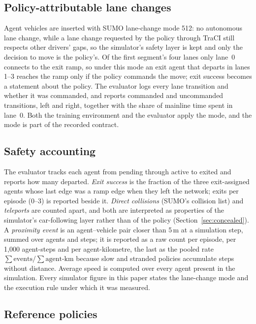 \subsection{Policy-attributable lane changes}
\label{sec:contract_lc}

Agent vehicles are inserted with SUMO lane-change mode 512: no autonomous lane change, while a lane change requested by the policy through TraCI still respects other drivers' gaps, so the simulator's safety layer is kept and only the decision to move is the policy's. Of the first segment's four lanes only lane~0 connects to the exit ramp, so under this mode an exit agent that departs in lanes 1--3 reaches the ramp only if the policy commands the move; exit success becomes a statement about the policy. The evaluator logs every lane transition and whether it was commanded, and reports commanded and uncommanded transitions, left and right, together with the share of mainline time spent in lane~0. Both the training environment and the evaluator apply the mode, and the mode is part of the recorded contract.

\subsection{Safety accounting}
\label{sec:contract_safety}

The evaluator tracks each agent from pending through active to exited and reports how many departed. \emph{Exit success} is the fraction of the three exit-assigned agents whose last edge was a ramp edge when they left the network; exits per episode (0--3) is reported beside it. \emph{Direct collisions} (SUMO's collision list) and \emph{teleports} are counted apart, and both are interpreted as properties of the simulator's car-following layer rather than of the policy (Section~\ref{sec:concealed}). A \emph{proximity event} is an agent--vehicle pair closer than 5\,m at a simulation step, summed over agents and steps; it is reported as a raw count per episode, per 1{,}000 agent-steps and per agent-kilometre, the last as the pooled rate $\sum\text{events}/\sum\text{agent-km}$ because slow and stranded policies accumulate steps without distance. Average speed is computed over every agent present in the simulation. Every simulator figure in this paper states the lane-change mode and the execution rule under which it was measured.

\subsection{Reference policies}
\label{sec:contract_refs}

